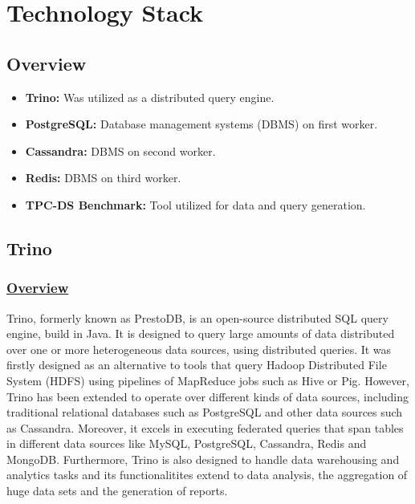 \documentclass[conference]{IEEEtran}
\begin{document}
\section{Technology Stack}

\subsection{Overview}

\begin{itemize}
    \item \textbf{Trino:} Was utilized as a distributed query engine.
    \item \textbf{PostgreSQL:} Database management systems (DBMS) on first worker.
    \item \textbf{Cassandra:} DBMS on second worker.
    \item \textbf{Redis:} DBMS on third worker.
    \item \textbf{TPC-DS Benchmark:} Tool utilized for data and query generation.
\end{itemize}

\subsection{Trino}

\subsubsection{\textbf{\underline{Overview}}}
Trino, formerly known as PrestoDB, is an open-source distributed SQL query engine, build in Java. It is designed to query large amounts of data
distributed over one or more heterogeneous data sources, using distributed queries. It was firstly designed as an alternative to tools that query
Hadoop Distributed File System (HDFS) using pipelines of MapReduce jobs such as Hive or Pig. However, Trino has been extended to operate over different
kinds of data sources, including traditional relational databases such as PostgreSQL and other data sources such as Cassandra. Moreover, it excels in
executing federated queries that span tables in different data sources like MySQL, PostgreSQL, Cassandra, Redis and MongoDB. Furthermore, Trino is
also designed to handle data warehousing and analytics tasks and its functionalitites extend to data analysis, the aggregation of huge data sets and the generation of reports.
\end{document}
